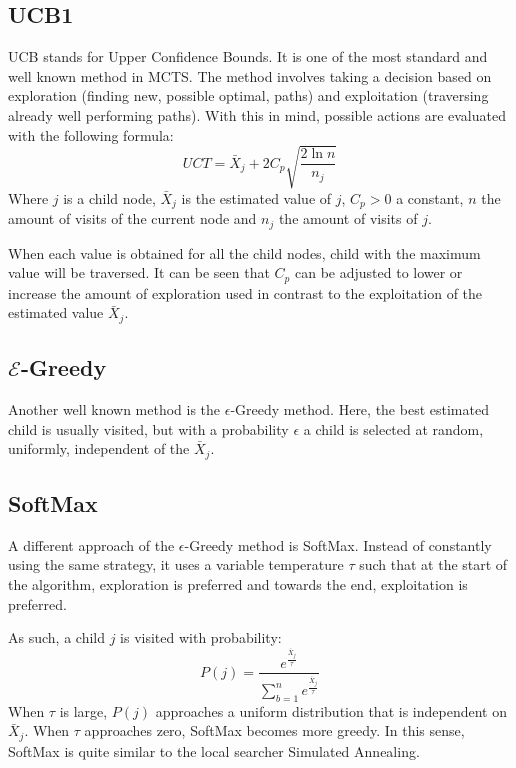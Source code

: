 \documentclass{acm_proc_article-sp}
\begin{document}
\subsection{UCB1}
UCB stands for Upper Confidence Bounds. It is one of the most standard and well known method in MCTS. The method involves taking a decision based on exploration (finding new, possible optimal, paths) and exploitation (traversing already well performing paths). With this in mind, possible actions are evaluated with the following formula:
\begin{equation}
UCT = \bar{X}_j + 2 C_p\sqrt{\frac{2 \ln n}{n_j}}
\end{equation}
Where $j$ is a child node, $\bar{X}_j$ is the estimated value of $j$, $C_p > 0$ a constant, $n$ the amount of visits of the current node and $n_j$ the amount of visits of $j$.

When each value is obtained for all the child nodes, child with the maximum value will be traversed. It can be seen that $C_p$ can be adjusted to lower or increase the amount of exploration used in contrast to the exploitation of the estimated value $\bar{X}_j$.

\subsection{$\mathcal{E}$-Greedy}

Another well known method is the $\epsilon$-Greedy method. Here, the best estimated child is usually visited, but with a probability $\epsilon$ a child is selected at random, uniformly, independent of the $\bar{X}_j$.

\subsection{SoftMax}
A different approach of the $\epsilon$-Greedy method is SoftMax. Instead of constantly using the same strategy, it uses a variable temperature $\tau$ such that at the start of the algorithm, exploration is preferred and towards the end, exploitation is preferred. 

As such, a child $j$ is visited with probability:
\begin{equation}
P(j) = \frac{e^\frac{\bar{X}_j}{\tau}}{\sum_{b=1}^{n} e^\frac{\bar{X}_j}{\tau}}
\end{equation}
When $\tau$ is large, $P(j)$ approaches a uniform distribution that is independent on $\bar{X}_j$. When $\tau$ approaches zero, SoftMax becomes more greedy. In this sense, SoftMax is quite similar to the local searcher Simulated Annealing.
\end{document}
